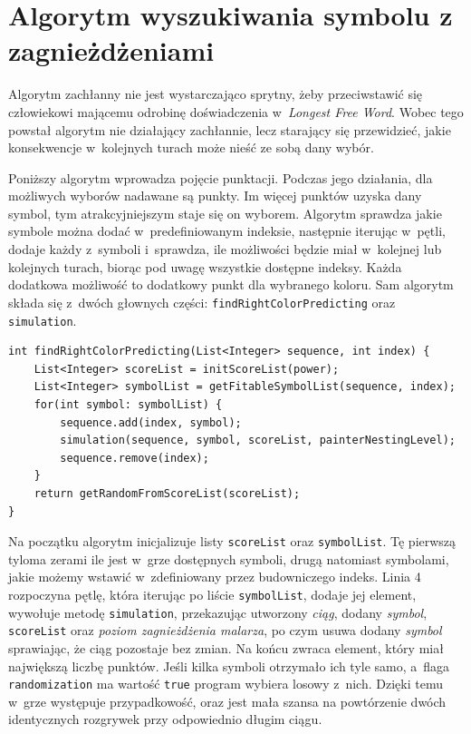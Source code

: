 \documentclass[document]{xmgr}
\begin{document}
\section{Algorytm wyszukiwania symbolu z zagnieżdżeniami}
Algorytm zachłanny nie jest wystarczająco sprytny, żeby przeciwstawić się człowiekowi mającemu odrobinę doświadczenia w~\emph{Longest Free Word}. Wobec tego powstał algorytm nie działający zachłannie, lecz starający się przewidzieć, jakie konsekwencje w~kolejnych turach może nieść ze sobą dany wybór.

Poniższy algorytm wprowadza pojęcie punktacji. Podczas jego działania, dla możliwych wyborów nadawane są punkty. Im więcej punktów uzyska dany symbol, tym atrakcyjniejszym staje się on wyborem. Algorytm sprawdza jakie symbole można dodać w~predefiniowanym indeksie, następnie iterując w~pętli, dodaje każdy z~symboli i~sprawdza, ile możliwości będzie miał w~kolejnej lub kolejnych turach, biorąc pod uwagę wszystkie dostępne indeksy. Każda dodatkowa możliwość to dodatkowy punkt dla wybranego koloru. Sam algorytm składa się z~dwóch głownych części: \mbox{\texttt{findRightColorPredicting}} oraz \texttt{simulation}.

\begin{lstlisting}[frame=single]
int findRightColorPredicting(List<Integer> sequence, int index) {
	List<Integer> scoreList = initScoreList(power);
	List<Integer> symbolList = getFitableSymbolList(sequence, index);
	for(int symbol: symbolList) {
		sequence.add(index, symbol);
		simulation(sequence, symbol, scoreList, painterNestingLevel);
		sequence.remove(index);
	}
	return getRandomFromScoreList(scoreList);
}
\end{lstlisting}
 
Na początku algorytm inicjalizuje listy \texttt{scoreList} oraz \texttt{symbolList}. Tę pierwszą tyloma zerami ile jest w~grze dostępnych symboli, drugą natomiast symbolami, jakie możemy wstawić w~zdefiniowany przez budowniczego indeks. Linia 4 rozpoczyna pętlę, która iterując po liście \texttt{symbolList}, dodaje jej element, wywołuje metodę \texttt{simulation}, przekazując utworzony \emph{ciąg}, dodany \emph{symbol}, \texttt{scoreList} oraz \emph{poziom zagnieżdżenia malarza}, po czym usuwa dodany \emph{symbol} sprawiając, że ciąg pozostaje bez zmian. Na końcu zwraca element, który miał największą liczbę punktów. Jeśli kilka symboli otrzymało ich tyle samo, a~flaga \texttt{randomization} ma wartość \texttt{true} program wybiera losowy z~nich. Dzięki temu w~grze występuje przypadkowość, oraz jest mała szansa na powtórzenie dwóch identycznych rozgrywek przy odpowiednio długim ciągu.
\end{document}
